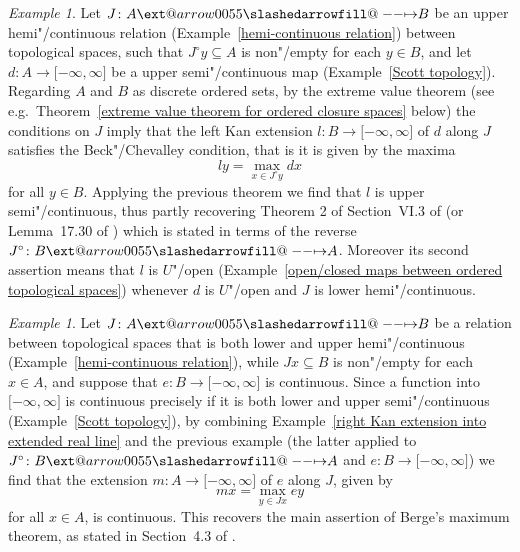 \documentclass[preprint, a4paper]{elsarticle}
\makeatletter
\def\slashedarrowfill@#1#2#3#4#5{%
  $\m@th\thickmuskip0mu\medmuskip\thickmuskip\thinmuskip\thickmuskip
   \relax#5#1\mkern-7mu%
   \cleaders\hbox{$#5\mkern-2mu#2\mkern-2mu$}\hfill
   \mathclap{#3}\mathclap{#2}%
   \cleaders\hbox{$#5\mkern-2mu#2\mkern-2mu$}\hfill
   \mkern-7mu#4$%
}
\def\rightslashedarrowfill@{%
  \slashedarrowfill@\relbar\relbar\mapstochar\rightarrow}
\newcommand\xslashedrightarrow[2][]{%
  \ext@arrow 0055{\rightslashedarrowfill@}{#1}{#2}}
\def\slashedrightarrow{\xslashedrightarrow{}}
\theoremstyle{definition}
\theoremstyle{remark}
\newtheorem{example}[theorem]{Example}
\providecommand{\exref}[1]{Example~\ref{#1}}
\providecommand{\thmref}[1]{Theorem~\ref{#1}}
\providecommand{\brks}[1]{\lbrack #1 \rbrack}
\providecommand{\rev}[1]{#1^\circ}
\providecommand{\map}[3]{#1\colon#2\to#3}
\providecommand{\hmap}[3]{#1\colon#2\slashedrightarrow#3}
\providecommand{\2}{\mathsf 2}
\makeatother
\begin{document}
	\begin{example}
		Let $\hmap JAB$ be an upper hemi"/continuous relation (\exref{hemi-continuous relation}) between topological spaces, such that $\rev Jy \subseteq A$ is non"/empty for each $y \in B$, and let $\map dA{\brks{-\infty, \infty}}$ be a upper semi"/continuous map (\exref{Scott topology}). Regarding $A$ and $B$ as discrete ordered sets, by the extreme value theorem (see e.g.\ \thmref{extreme value theorem for ordered closure spaces} below) the conditions on $J$ imply that the left Kan extension $\map lB{\brks{-\infty, \infty}}$ of $d$ along $J$ satisfies the Beck"/Chevalley condition, that is it is given by the maxima
		\begin{displaymath}
			ly = \max_{x \in \rev Jy} dx
		\end{displaymath}
		for all $y \in B$. Applying the previous theorem we find that $l$ is upper semi"/continuous, thus partly recovering Theorem 2 of Section~VI.3 of \cite{Berge59} (or Lemma~17.30 of \cite{Aliprantis-Border06}) which is stated in terms of the reverse $\hmap{\rev J}BA$. Moreover its second assertion means that $l$ is $U$"/open (\exref{open/closed maps between ordered topological spaces}) whenever $d$ is $U$"/open and $J$ is lower hemi"/continuous.
	\end{example}
	
	\begin{example}
		Let $\hmap JAB$ be a relation between topological spaces that is both lower and upper hemi"/continuous (\exref{hemi-continuous relation}), while $Jx \subseteq B$ is non"/empty for each $x \in A$, and suppose that $\map eB{\brks{-\infty, \infty}}$ is continuous. Since a function into $\brks{-\infty, \infty}$ is continuous precisely if it is both lower and upper semi"/continuous (\exref{Scott topology}), by combining \exref{right Kan extension into extended real line} and the previous example (the latter applied to $\hmap{\rev J}BA$ and $\map eB{\brks{-\infty, \infty}}$) we find that the extension \mbox{$\map mA{\brks{-\infty, \infty}}$} of $e$ along $J$, given by
		\begin{displaymath}
			mx = \max_{y \in Jx} ey
		\end{displaymath}
		for all $x \in A$, is continuous. This recovers the main assertion of Berge's maximum theorem, as stated in Section~4.3 of \cite{Berge59}.
	\end{example}
	
\end{document}
